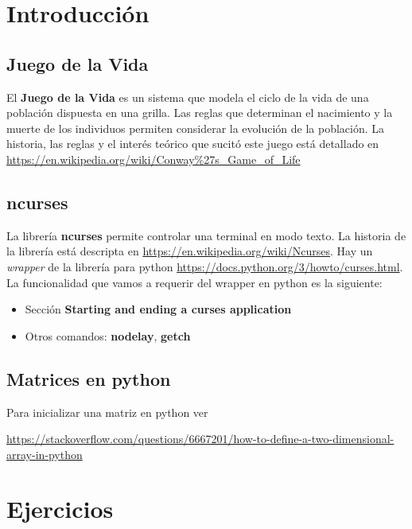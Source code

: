 \documentclass[a4paper]{article}
\begin{document}

\section{Introducción}

\subsection{Juego de la Vida}

El \textbf{Juego de la Vida} es un sistema que modela el ciclo de la vida 
de una población dispuesta en una grilla. Las reglas que 
determinan el nacimiento y la muerte de los individuos permiten 
considerar la evolución de la población. La historia, las reglas y el 
interés teórico que sucitó este juego  está detallado en \url{https://en.wikipedia.org/wiki/Conway%27s_Game_of_Life}

\subsection{ncurses}

La librería \textbf{ncurses} permite controlar una terminal en modo 
texto. La historia de la librería está descripta en 
\url{https://en.wikipedia.org/wiki/Ncurses}. Hay un \emph{wrapper} de 
la librería para python 
\url{https://docs.python.org/3/howto/curses.html}. La funcionalidad que 
vamos a requerir del wrapper en python es la siguiente:

\begin{itemize}
	\item Sección \textbf{Starting and ending a curses application}
	\item Otros comandos: \textbf{nodelay}, \textbf{getch}
\end{itemize}

\subsection{Matrices en python}

Para inicializar una matriz en python ver

\smallskip

\url{https://stackoverflow.com/questions/6667201/how-to-define-a-two-dimensional-array-in-python}

\section{Ejercicios}
\end{document}
